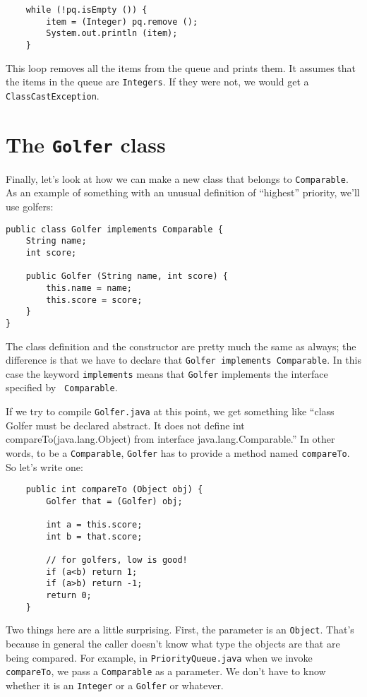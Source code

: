 \begin{verbatim}
    while (!pq.isEmpty ()) {
        item = (Integer) pq.remove ();
        System.out.println (item);
    }
\end{verbatim}
%
This loop removes all the items from the queue and prints them.
It assumes that the items in the queue are {\tt Integers}.
If they were not, we would get a {\tt ClassCastException}.


\section{The {\tt Golfer} class}

Finally, let's look at how we can make a new class that belongs to
{\tt Comparable}.  As an example of something with an unusual definition
of ``highest'' priority, we'll use golfers:

\begin{verbatim}
public class Golfer implements Comparable {
    String name;
    int score;

    public Golfer (String name, int score) {
        this.name = name;
        this.score = score;
    }
}
\end{verbatim}
%
The class definition and the constructor are pretty much the same as
always; the difference is that we have to declare that {\tt Golfer
implements Comparable}.  In this case the keyword {\tt implements}
means that {\tt Golfer} implements the interface specified by {\tt
Comparable}.

If we try to compile {\tt Golfer.java} at
this point, we get something like ``class Golfer must be declared
abstract. It does not define int compareTo(java.lang.Object) from
interface java.lang.Comparable.''  In other words, to be a {\tt Comparable},
{\tt Golfer} has to provide a method named {\tt compareTo}.  So
let's write one:

\begin{verbatim}
    public int compareTo (Object obj) {
        Golfer that = (Golfer) obj;

        int a = this.score;
        int b = that.score;
	
        // for golfers, low is good!
        if (a<b) return 1;
        if (a>b) return -1;
        return 0;
    }
\end{verbatim}
%
Two things here are a little surprising.  First, the parameter
is an {\tt Object}.  That's because in general the caller doesn't
know what type the objects are that are being compared.  For
example, in {\tt PriorityQueue.java} when we invoke {\tt compareTo},
we pass a {\tt Comparable} as a parameter.  We don't have to
know whether it is an {\tt Integer} or a {\tt Golfer} or whatever.

